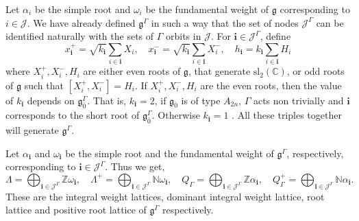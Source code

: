 \documentclass[11pt]{amsart}
\theoremstyle{plain}
\theoremstyle{definition}
\newcommand{\g}{\mathfrak{g}}
\begin{document}
Let $\alpha_{i}$ be the simple root and $\omega_{i}$ be the fundamental weight of $\g$ corresponding to $i\in \mathcal{J}$. We have already defined $\g^{\Gamma}$ in such a way that the set of nodes $\mathcal{J}^{\Gamma}$ can be identified naturally with the sets of $\Gamma$ orbits in $\mathcal{J}$. For $\textbf{i}\in \mathcal{J}^{\Gamma}$, define
\begin{equation}
    x^{+}_{\textbf{i}}=\sqrt{k_{\textbf{i}}}\sum_{i\in\textbf{i}}X_{i},\quad x^{-}_{\textbf{i}}=\sqrt{k_{\textbf{i}}}\sum_{i\in\textbf{i}}X^{-}_{i},\quad h_{\textbf{i}}=k_{\textbf{i}}\sum_{i\in\textbf{i}}H_{i}
\end{equation}
where $X^{+}_{i}, X^{-}_{i}, H_{i}$ are either even roots of $\g$, that generate $\mbox{sl}_{2}(\mathbb{C})$, or odd roots of $\g$ such that $[X^{+}_{i}, X^{-}_{i}]=H_{i}$. If $X_{i}^{+}, X^{-}_{i}, H_{i}$ are the even roots, then the value of $k_{\textbf{i}}$ depends on $\g^{\Gamma}_{\bar{0}}$. That is,  $k_{\textbf{i}}=2$, if $\g_{\bar{0}}$ is of type $A_{2n}$, $\Gamma$ acts non trivially and $\textbf{i}$ corresponds to the short root of $\g^{\Gamma}_{\bar{0}}$. Otherwise $k_{\textbf{i}}=1$ \cite{FMS15}. All these triples together will generate $\g^{\Gamma}$.
\smallskip

Let $\alpha_{\textbf{i}}$ and $\omega_{\textbf{i}}$ be the simple root and the fundamental weight of $\g^{\Gamma}$, respectively, corresponding to $\textbf{i}\in \mathcal{J}^{\Gamma}$. Thus we get,
\begin{equation}\label{eq:10}
    \Lambda=\bigoplus_{\textbf{i}\in \mathcal{J}^{\Gamma}}\mathbb{Z}\omega_{\textbf{i}},\quad \Lambda^{+}=\bigoplus_{\textbf{i}\in \mathcal{J}^{\Gamma}}\mathbb{N}\omega_{\textbf{i}},\quad Q_{\Gamma}=\bigoplus_{\textbf{i}\in \mathcal{J}^{\Gamma}}\mathbb{Z}\alpha_{\textbf{i}},\quad Q^{+}_{\Gamma}=\bigoplus_{\textbf{i}\in \mathcal{J}^{\Gamma}}\mathbb{N}\alpha_{\textbf{i}}.
\end{equation}
These are the integral weight lattices, dominant integral weight lattice, root lattice and positive root lattice of $\g^{\Gamma}$ respectively.
\end{document}
